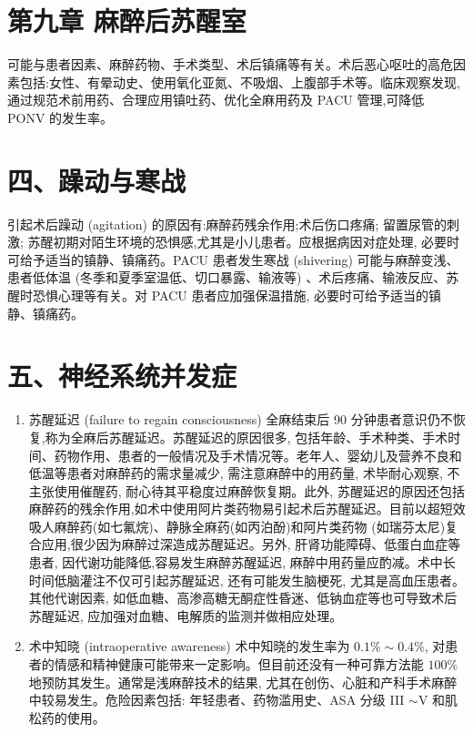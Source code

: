 \documentclass[10pt]{article}
\begin{document}
\section*{第九章 麻醉后苏醒室}
可能与患者因素、麻醉药物、手术类型、术后镇痛等有关。术后恶心呕吐的高危因素包括:女性、有晕动史、使用氧化亚氮、不吸烟、上腹部手术等。临床观察发现,通过规范术前用药、合理应用镇吐药、优化全麻用药及 PACU 管理,可降低 PONV 的发生率。

\section*{四、躁动与寒战}
引起术后躁动 (agitation) 的原因有:麻醉药残余作用;术后伤口疼痛; 留置尿管的刺激; 苏醒初期对陌生环境的恐惧感,尤其是小儿患者。应根据病因对症处理, 必要时可给予适当的镇静、镇痛药。PACU 患者发生寒战 (shivering) 可能与麻醉变浅、患者低体温 (冬季和夏季室温低、切口暴露、输液等) 、术后疼痛、输液反应、苏醒时恐惧心理等有关。对 PACU 患者应加强保温措施, 必要时可给予适当的镇静、镇痛药。

\section*{五、神经系统并发症}
\begin{enumerate}
  \item 苏醒延迟 (failure to regain consciousness) 全麻结束后 90 分钟患者意识仍不恢复,称为全麻后苏醒延迟。苏醒延迟的原因很多, 包括年龄、手术种类、手术时间、药物作用、患者的一般情况及手术情况等。老年人、婴幼儿及营养不良和低温等患者对麻醉药的需求量减少, 需注意麻醉中的用药量, 术毕耐心观察, 不主张使用催醒药, 耐心待其平稳度过麻醉恢复期。此外, 苏醒延迟的原因还包括麻醉药的残余作用,如术中使用阿片类药物易引起术后苏醒延迟。目前以超短效吸人麻醉药(如七氟烷)、静脉全麻药(如丙泊酚)和阿片类药物 (如瑞芬太尼)复合应用,很少因为麻醉过深造成苏醒延迟。另外, 肝肾功能障碍、低蛋白血症等患者, 因代谢功能降低,容易发生麻醉苏醒延迟, 麻醉中用药量应酌减。术中长时间低脑灌注不仅可引起苏醒延迟, 还有可能发生脑梗死, 尤其是高血压患者。其他代谢因素, 如低血糖、高渗高糖无酮症性昏迷、低钠血症等也可导致术后苏醒延迟, 应加强对血糖、电解质的监测并做相应处理。

  \item 术中知晓 (intraoperative awareness) 术中知晓的发生率为 $0.1 \% \sim 0.4 \%$, 对患者的情感和精神健康可能带来一定影响。但目前还没有一种可靠方法能 $100 \%$ 地预防其发生。通常是浅麻醉技术的结果, 尤其在创伤、心脏和产科手术麻醉中较易发生。危险因素包括: 年轻患者、药物滥用史、ASA 分级 III $\sim \mathrm{V}$ 和肌松药的使用。

\end{enumerate}
\end{document}
